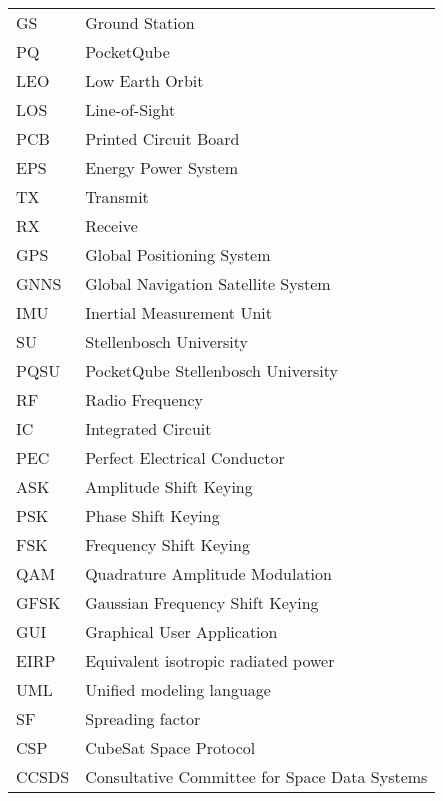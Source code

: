 \begingroup
\renewcommand{\arraystretch}{1.2}
\begin{tabular}{@{}p{2.5cm} l}
    GS      & Ground Station \\
    PQ      & PocketQube \\
    LEO     & Low Earth Orbit \\
    LOS     & Line-of-Sight \\
    PCB     & Printed Circuit Board \\
    EPS     & Energy Power System \\
    TX      & Transmit \\
    RX      & Receive \\
    GPS     & Global Positioning System \\
    GNNS    & Global Navigation Satellite System \\ 
    IMU     & Inertial Measurement Unit \\
    SU      & Stellenbosch University \\
    PQSU    & PocketQube Stellenbosch University \\
    RF      & Radio Frequency \\
    IC      & Integrated Circuit \\
    PEC     & Perfect Electrical Conductor \\
    ASK     & Amplitude Shift Keying \\
    PSK     & Phase Shift Keying \\
    FSK     & Frequency Shift Keying \\
    QAM     & Quadrature Amplitude Modulation \\
    GFSK    & Gaussian Frequency Shift Keying \\
    GUI     & Graphical User Application \\
    EIRP    & Equivalent isotropic radiated power \\
    UML     & Unified modeling language \\
    SF      & Spreading factor \\
    CSP     & CubeSat Space Protocol \\
    CCSDS   & Consultative Committee for Space Data Systems \\
\end{tabular}
\endgroup
